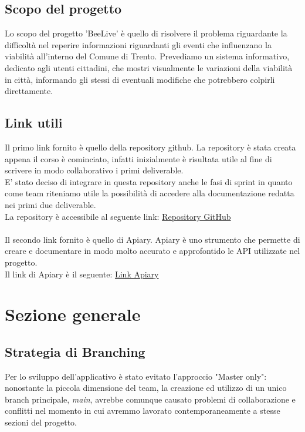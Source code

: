 \documentclass{article}
\begin{document}
\subsection{Scopo del progetto}

Lo scopo del progetto 'BeeLive' è quello di risolvere il problema riguardante la difficoltà nel reperire informazioni riguardanti gli eventi che influenzano la viabilità all'interno del Comune di Trento. Prevediamo un sistema informativo, dedicato agli utenti cittadini, che mostri visualmente le variazioni della viabilità in città, informando gli stessi di eventuali modifiche che potrebbero colpirli direttamente.

\subsection{Link utili}
Il primo link fornito è quello della repository github. La repository è stata creata appena il corso è cominciato, infatti inizialmente è risultata utile al fine di scrivere in modo collaborativo i primi deliverable.\\
E' stato deciso di integrare in questa repository anche le fasi di sprint in quanto come team riteniamo utile la possibilità di accedere alla documentazione redatta nei primi due deliverable.\\
La repository è accessibile al seguente link: \href{https://github.com/ELI20ZIVI/BeeLive/}{Repository GitHub}\\ \\
Il secondo link fornito è quello di Apiary. Apiary è uno strumento che permette di creare e documentare in modo molto accurato e approfontido le API utilizzate nel progetto.\\
Il link di Apiary è il seguente: \href{https://beelive.docs.apiary.io/#}{Link Apiary}\\

\clearpage

\section{Sezione generale}

\subsection{Strategia di Branching}

Per lo sviluppo dell'applicativo è stato evitato l'approccio "Master only": nonostante la piccola dimensione del team, la creazione ed utilizzo di un unico branch principale, \textit{main}, avrebbe comunque causato problemi di collaborazione e conflitti nel momento in cui avremmo lavorato contemporaneamente a stesse sezioni del progetto.\\
\end{document}

